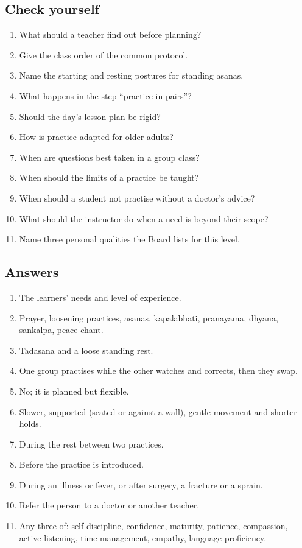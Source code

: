 \subsection*{Check yourself}
\begin{enumerate}
\item What should a teacher find out before planning?
\item Give the class order of the common protocol.
\item Name the starting and resting postures for standing asanas.
\item What happens in the step ``practice in pairs''?
\item Should the day's lesson plan be rigid?
\item How is practice adapted for older adults?
\item When are questions best taken in a group class?
\item When should the limits of a practice be taught?
\item When should a student not practise without a doctor's advice?
\item What should the instructor do when a need is beyond their scope?
\item Name three personal qualities the Board lists for this level.
\end{enumerate}

\subsection*{Answers}
\begin{enumerate}
\item The learners' needs and level of experience.
\item Prayer, loosening practices, asanas, kapalabhati, pranayama, dhyana, sankalpa, peace chant.
\item Tadasana and a loose standing rest.
\item One group practises while the other watches and corrects, then they swap.
\item No; it is planned but flexible.
\item Slower, supported (seated or against a wall), gentle movement and shorter holds.
\item During the rest between two practices.
\item Before the practice is introduced.
\item During an illness or fever, or after surgery, a fracture or a sprain.
\item Refer the person to a doctor or another teacher.
\item Any three of: self-discipline, confidence, maturity, patience, compassion, active listening, time management, empathy, language proficiency.
\end{enumerate}

